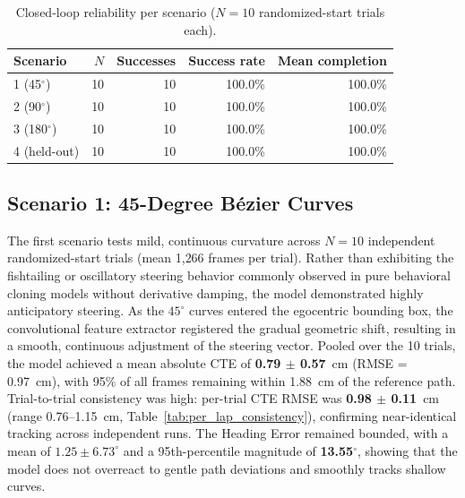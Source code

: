 \begin{table}[H]
\centering
\caption{Closed-loop reliability per scenario ($N=10$ randomized-start trials each).}
\label{tab:reliability}
\footnotesize
\begin{tabular}{@{}l r r r r@{}}
\toprule
\textbf{Scenario} & \textbf{$N$} & \textbf{Successes} & \textbf{Success rate} & \textbf{Mean completion} \\
\midrule
1 (45$^\circ$)      & 10 & 10 & 100.0\% & 100.0\% \\
2 (90$^\circ$)      & 10 & 10 & 100.0\% & 100.0\% \\
3 (180$^\circ$)     & 10 & 10 & 100.0\% & 100.0\% \\
4 (held-out)        & 10 & 10 & 100.0\% & 100.0\% \\
\bottomrule
\end{tabular}
\end{table}

\FloatBarrier

\subsection{Scenario 1: 45-Degree B{\'e}zier Curves}
The first scenario tests mild, continuous curvature across $N=10$ independent randomized-start trials (mean 1{,}266 frames per trial). Rather than exhibiting the fishtailing or oscillatory steering behavior commonly observed in pure behavioral cloning models without derivative damping, the model demonstrated highly anticipatory steering. As the $45^\circ$ curves entered the egocentric bounding box, the convolutional feature extractor registered the gradual geometric shift, resulting in a smooth, continuous adjustment of the steering vector. Pooled over the 10 trials, the model achieved a mean absolute CTE of \textbf{0.79 $\pm$ 0.57}~cm (RMSE = 0.97~cm), with 95\% of all frames remaining within 1.88~cm of the reference path. Trial-to-trial consistency was high: per-trial CTE RMSE was \textbf{0.98 $\pm$ 0.11}~cm (range 0.76--1.15~cm, Table~\ref{tab:per_lap_consistency}), confirming near-identical tracking across independent runs. The Heading Error remained bounded, with a mean of $1.25 \pm 6.73^\circ$ and a 95th-percentile magnitude of \textbf{13.55$^\circ$}, showing that the model does not overreact to gentle path deviations and smoothly tracks shallow curves.

\FloatBarrier

